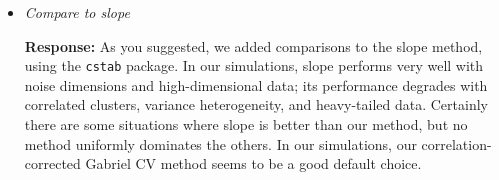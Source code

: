 \documentclass[11pt]{article}
\begin{document}
\begin{itemize}


\item \textit{Compare to slope}

\textbf{Response:} As you suggested, we added comparisons to the slope method,
using the \texttt{cstab} package. In our simulations, slope performs very well
with noise dimensions and high-dimensional data; its performance degrades with
correlated clusters, variance heterogeneity, and heavy-tailed data. Certainly
there are some situations where slope is better than our method, but no method
uniformly dominates the others. In our simulations, our correlation-corrected
Gabriel CV method seems to be a good default choice.

% 
% 
% 
% 
% 

\end{itemize}
\end{document}
